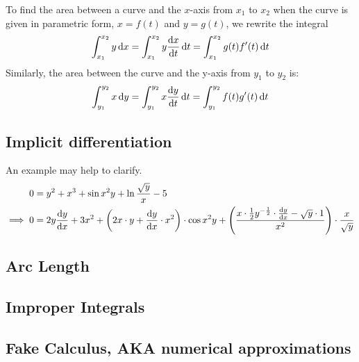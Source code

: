 \documentclass[fleqn,a4paper,11pt]{article}
\begin{document}
    To find the area between a curve and the \(x\)-axis from \(x_1\) to \(x_2\)
    when the curve is given in parametric form, \(x = f(t)\) and \(y = g(t)\),
    we rewrite the integral
    \begin{equation}
    \int_{x_1}^{x_2} y \dd{x} =
     \int_{x_1}^{x_2} y \dv{x}{t} \dd{t} = \int_{x_1}^{x_2} g(t)f'(t) \dd{t}
    \end{equation}
    Similarly, the area between the curve and the y-axis from \(y_1\) to \(y_2\)
    is:
    \begin{equation}
    \int_{y_1}^{y_2} x \dd{y} =
     \int_{y_1}^{y_2} x \dv{y}{t} \dd{t} = \int_{y_1}^{y_2} f(t)g'(t) \dd{t}
    \end{equation}

    \subsection{Implicit differentiation}



    An example may help to clarify.
    \begin{align*}
    0 &= y^2 + x^3 + \sin x^2 y + \ln \frac{\sqrt y} x - 5 \\
    \implies 0 &=
                2y \dv{y}{x} + 3x^2 +
                \pqty{2x \cdot y + \dv{y}{x} \cdot x^2} \cdot \cos x^2 y +
                \pqty{\frac{x \cdot \frac 12 y^{-\frac 12} \cdot \dv{y}{x} -
                            \sqrt y \cdot 1}
                           {x^2}} \cdot \frac{x}{\sqrt y} \\
    \end{align*}


    \subsection{Arc Length}

    \subsection{Improper Integrals}


    \subsection{Fake Calculus, AKA numerical approximations}
\end{document}
